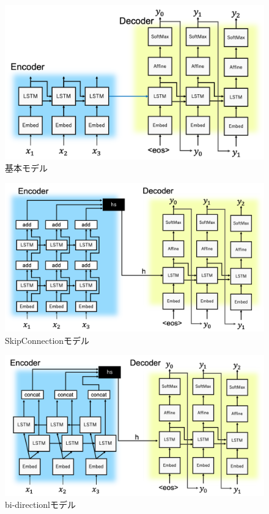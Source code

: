 \documentclass[a4j,11pt,report]{jsbook}
\begin{document}
\begin{center}
  \begin{figure}[H]
    \centering
    \includegraphics[width=0.9\linewidth]{image/seq2seq_image.png}
    \caption{基本モデル}
    \label{fig:seq2seq}
  \end{figure}
\end{center}

\begin{center}
  \begin{figure}[H]
    \centering
    \includegraphics[width=0.9\linewidth]{image/Skipconnect.png}
    \caption{SkipConnectionモデル}
    \label{fig:SkipSeq2seq}
  \end{figure}
\end{center}

\begin{center}
  \begin{figure}[H]
    \centering
    \includegraphics[width=0.9\linewidth]{image/twinRNN.png}
    \caption{bi-directionlモデル}
    \label{fig:bi-directionl Seq2seq}
  \end{figure}
\end{center}
\end{document}

